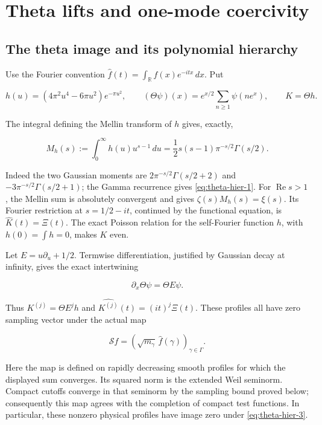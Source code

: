 \section{Theta lifts and one-mode coercivity}
\label{sec:theta-coercivity}

\subsection{The theta image and its polynomial hierarchy}

Use the Fourier convention $\widehat f(t)=\int_{\mathbb R}f(x)e^{-itx}\,dx$. Put

\[
 h(u)=(4\pi^2u^4-6\pi u^2)e^{-\pi u^2},\qquad
 (\Theta\psi)(x)=e^{x/2}\sum_{n\ge1}\psi(ne^x),\qquad K=\Theta h.
\]

The integral defining the Mellin transform of $h$ gives, exactly,

\begin{equation}
M_h(s):=\int_0^\infty h(u)u^{s-1}\,du
   =\frac12s(s-1)\pi^{-s/2}\Gamma(s/2).
 \label{eq:theta-hier-1}
\end{equation}

Indeed the two Gaussian moments are
$2\pi^{-s/2}\Gamma(s/2+2)$ and
$-3\pi^{-s/2}\Gamma(s/2+1)$; the Gamma recurrence gives \eqref{eq:theta-hier-1}.
For $\operatorname{Re}s>1$, the Mellin sum is absolutely convergent and gives
$\zeta(s)M_h(s)=\xi(s)$. Its Fourier restriction at
$s=1/2-it$, continued by the functional equation, is
$\widehat K(t)=\Xi(t)$. The exact Poisson relation for the self-Fourier function $h$, with $h(0)=\int h=0$, makes $K$ even.

Let $E=u\partial_u+1/2$. Termwise differentiation, justified by Gaussian decay at infinity, gives the exact intertwining

\begin{equation}
\partial_x\Theta\psi=\Theta E\psi.
 \label{eq:theta-hier-2}
\end{equation}

Thus $K^{(j)}=\Theta E^jh$ and
$\widehat{K^{(j)}}(t)=(it)^j\Xi(t)$. These profiles all have zero sampling vector under the actual map

\begin{equation}
\mathcal S f=(\sqrt{m_\gamma}\,\widehat f(\gamma))_{\gamma\in\Gamma}.
 \label{eq:theta-hier-3}
\end{equation}

Here the map is defined on rapidly decreasing smooth profiles for which the displayed sum converges. Its squared norm is the extended Weil seminorm. Compact cutoffs converge in that seminorm by the sampling bound proved below; consequently this map agrees with the completion of compact test functions. In particular, these nonzero physical profiles have image zero under \eqref{eq:theta-hier-3}. 


